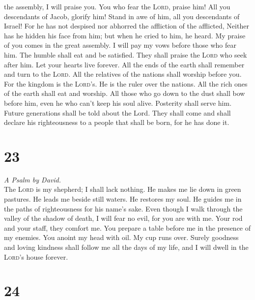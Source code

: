 the assembly, I will praise you.  You who fear the
\textsc{Lord}, praise him! All you descendants of Jacob, glorify him!
Stand in awe of him, all you descendants of Israel!  For
he has not despised nor abhorred the affliction of the afflicted,
Neither has he hidden his face from him; but when he cried to him, he
heard.  My praise of you comes in the great assembly. I
will pay my vows before those who fear him.  The humble
shall eat and be satisfied. They shall praise the \textsc{Lord} who seek
after him. Let your hearts live forever.  All the ends of
the earth shall remember and turn to the \textsc{Lord}. All the
relatives of the nations shall worship before you.  For
the kingdom is the \textsc{Lord}'s. He is the ruler over the nations.
 All the rich ones of the earth shall eat and worship.
All those who go down to the dust shall bow before him, even he who
can't keep his soul alive.  Posterity shall serve him.
Future generations shall be told about the Lord.  They
shall come and shall declare his righteousness to a people that shall be
born, for he has done it.

\hypertarget{section-22}{%
\section{23}\label{section-22}}

\emph{A Psalm by David.}\\
 The \textsc{Lord} is my shepherd; I shall lack nothing.
 He makes me lie down in green pastures. He leads me
beside still waters.  He restores my soul. He guides me in
the paths of righteousness for his name's sake.  Even
though I walk through the valley of the shadow of death, I will fear no
evil, for you are with me. Your rod and your staff, they comfort me.
 You prepare a table before me in the presence of my
enemies. You anoint my head with oil. My cup runs over. 
Surely goodness and loving kindness shall follow me all the days of my
life, and I will dwell in the \textsc{Lord}'s house forever.

\hypertarget{section-23}{%
\section{24}\label{section-23}}

